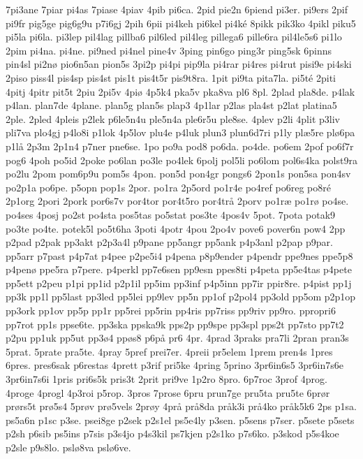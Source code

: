{7pi3ane
7piar
pi4as
7piase
4piav
4pib
pi6ca.
2pid
pie2n
6piend
pi3er.
pi9ers
2pif
pi9fr
pig5ge
pig6g9u
p7i6gj
2pih
6pii
pi4keh
pi6kel
pi4k^^e9
8pikk
pik3ko
4pikl
piku5
pi5la
pi6la.
pi3lep
pil4lag
pillba6
pil6led
pil4leg
pillega6
pille6ra
pil4le5s6
pi1lo
2pim
pi4na.
pi4ne.
pi9ned
pi4nel
pine4v
3ping
pin6go
ping3r
ping5sk
6pinns
pin4sl
pi2n^^f8
pio6n5an
pion5s
3pi2p
pi4pi
pip9la
pi4rar
pi4res
pi4rut
pisi9e
pi4ski
2piso
piss4l
pis4sp
pis4st
pis1t
pis4t5r
pis9t8ra.
1pit
pi9ta
pita7la.
pi5t^^e9
2piti
4pitj
4pitr
pit5t
2piu
2pi5v
4pi^^f8
4p5k4
pka5v
pka8va
pl6
8pl.
2plad
pla8de.
p4lak
p4lan.
plan7de
4plane.
plan5g
plan5s
plap3
4p1lar
p2las
pla4st
p2lat
platina5
2ple.
2pled
4pleis
p2lek
p6le5n4u
ple5n4a
ple6r5u
ple8se.
4plev
p2li
4plit
p3liv
pli7va
plo4gj
p4lo8i
p1lok
4p5lov
plu4e
p4luk
plun3
plun6d7ri
p1ly
pl^^e65re
pl^^f86pa
p1l^^e5
2p3m
2p1n4
p7ner
pne6se.
1po
po9a
pod8
po6da.
po4de.
po6em
2pof
po6f7r
pog6
4poh
po5id
2poke
po6lan
po3le
po4lek
6polj
pol5li
po6lom
pol6s4ka
polst9ra
po2lu
2pom
pom6p9u
pom5s
4pon.
pon5d
pon4gr
pongs6
2pon1s
pon5sa
pon4sv
po2p1a
po6pe.
p5opn
pop1s
2por.
po1ra
2p5ord
po1r4e
po4ref
po6reg
po8r^^e9
2p1org
2pori
2pork
por6s7v
por4tor
por4t5ro
por4tr^^e5
2porv
po1r^^e6
po1r^^f8
po4se.
po4ses
4posj
po2st
po4sta
pos5tas
po5stat
pos3te
4pos4v
5pot.
7pota
potak9
po3te
po4te.
potek5l
po5t6ha
3poti
4potr
4pou
2po4v
pove6
pover6n
pow4
2pp
p2pad
p2pak
pp3akt
p2p3a4l
p9pane
pp5angr
pp5ank
p4p3anl
p2pap
p9par.
pp5arr
p7past
p4p7at
p4pee
p2pe5i4
p4pena
p8p9ender
p4pendr
ppe9nes
ppe5p8
p4pen^^f8
ppe5ra
p7pere.
p4perkl
pp7e6sen
pp9esn
ppes8ti
p4peta
pp5e4tas
p4pete
pp5ett
p2peu
p1pi
pp1id
p2p1il
pp5im
pp3inf
p4p5inn
pp7ir
ppir8re.
p4pist
pp1j
pp3k
pp1l
pp5last
pp3led
pp5lei
pp9lev
pp5n
pp1of
p2pol4
pp3old
pp5om
p2p1op
pp3ork
pp1ov
pp5p
pp1r
pp5rei
pp5rin
pp4ris
pp7riss
pp9riv
pp9ro.
ppropri6
pp7rot
pp1s
ppse6te.
pp3ska
ppska9k
pps2p
pp9spe
pp3spl
pps2t
pp7sto
pp7t2
p2pu
pp1uk
pp5ut
pp3^^f84
pp^^f8s8
p6p^^e5
pr6
4pr.
4prad
3praks
pra7li
2pran
pran3s
5prat.
5prate
pra5te.
4pray
5pref
prei7er.
4preii
pr5elem
1prem
pren4s
1pres
6pres.
pres6sak
p6restas
4prett
p3rif
pri5ke
4pring
5prino
3pr6in6s5
3pr6in7s6e
3pr6in7s6i
1pris
pri6s5k
pris3t
2prit
pri9ve
1p2ro
8pro.
6p7roc
3prof
4prog.
4proge
4progl
4p3roi
p5rop.
3pros
7prose
6pru
prun7ge
pru5ta
pru5te
6pr^^f8r
pr^^f8rs5t
pr^^f85s4
5pr^^f8v
pr^^f85vels
2pr^^f8y
4pr^^e5
pr^^e58da
pr^^e5k3i
pr^^e54ko
pr^^e5k5k6
2ps
p1sa.
ps5a6n
p1sc
p3se.
psei8ge
p2sek
p2s1el
ps5e4ly
p3sen.
p5sens
p7ser.
p5sete
p5sets
p2sh
p6sib
ps5ins
p7sis
p3s4jo
p4s3kil
ps7kjen
p2s1ko
p7s6ko.
p3skod
p5s4koe
p2sle
p9s8lo.
psl^^f88va
psl^^f86ve.
}
